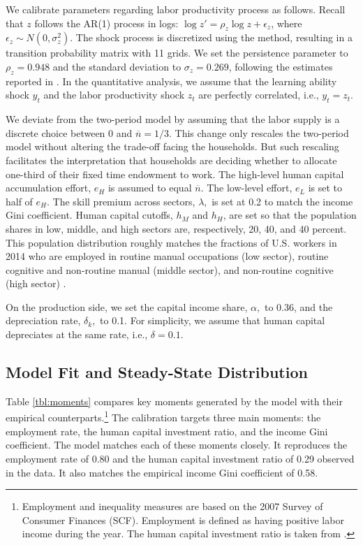 \documentclass[12pt,english]{article}
\numberwithin{equation}{section}
\begin{document}
We calibrate parameters regarding labor productivity process as follows.
Recall that $z$ follows the AR(1) process in logs: $\log z'=\rho_{z}\log z+\epsilon_{z}$,
where $\epsilon_{z}\sim N(0,\sigma_{z}^{2})$. The shock process is
discretized using the \citet{tauchen1986finite} method, resulting in a transition
probability matrix with 11 grids. We set the persistence parameter to $\rho_{z} = 0.948$ and the standard deviation to $\sigma_{z} = 0.269$, following the estimates reported in \citet{Chang2006}. In the quantitative analysis, we assume that the learning ability shock $y_t$ and the labor productivity shock $z_t$ are perfectly correlated, i.e., $y_t=z_t$.

We deviate from the two-period model by assuming that the labor supply is a discrete choice between 0 and $\overline{n}=1/3$. This change only rescales the two-period model without altering the trade-off facing the households. But such rescaling facilitates the interpretation that households are deciding whether to allocate one-third of their fixed time endowment to work. The high-level human capital accumulation
effort, $e_{H}$ is assumed to equal $\overline{n}.$ The low-level
effort, $e_{L}$ is set to half of $e_{H}$. The skill premium across
sectors, $\lambda,$ is set at 0.2 to match the income Gini coefficient.
Human capital cutoffs, $h_{M}$ and $h_{H}$, are set so that the population shares in low, middle, and high sectors are, respectively, 20, 40, and 40 percent. This population distribution roughly matches the fractions of U.S. workers in 2014 who are employed in routine manual occupations (low sector), routine cognitive and non-routine manual (middle sector), and non-routine cognitive (high sector) \cite{cortes_disappearing_2017}.


On the production side, we set the capital income share, $\alpha,$ to 0.36, and the depreciation rate, $\delta_k,$ to 0.1. For simplicity, we assume that human capital depreciates at the same rate, i.e., $\delta =0.1$.

\subsection{Model Fit and Steady-State Distribution}

Table \ref{tbl:moments} compares key moments generated by the model with their empirical counterparts.\footnote{Employment and inequality measures are based on the 2007 Survey of Consumer Finances (SCF). Employment is defined as having positive labor income during the year. The human capital investment ratio is taken from \citet{oecd2025adultlearning}.} The calibration targets three main moments: the employment rate, the human capital investment ratio, and the income Gini coefficient. The model matches each of these moments closely. It reproduces the employment rate of 0.80 and the human capital investment ratio of 0.29 observed in the data. It also matches the empirical income Gini coefficient of 0.58.
\end{document}
